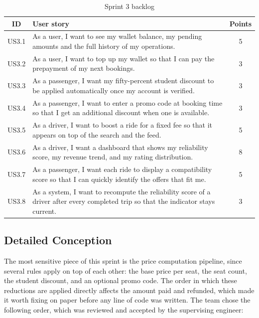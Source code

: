 \begin{table}[H]
\centering
\caption{Sprint 3 backlog}
\label{tab:sprint3_backlog}
\begin{tabular}{|c|p{8.5cm}|c|}
\hline
\textbf{ID} & \textbf{User story} & \textbf{Points} \\
\hline
US3.1 & As a user, I want to see my wallet balance, my pending amounts and the full history of my operations. & 5 \\
\hline
US3.2 & As a user, I want to top up my wallet so that I can pay the prepayment of my next bookings. & 3 \\
\hline
US3.3 & As a passenger, I want my fifty-percent student discount to be applied automatically once my account is verified. & 3 \\
\hline
US3.4 & As a passenger, I want to enter a promo code at booking time so that I get an additional discount when one is available. & 3 \\
\hline
US3.5 & As a driver, I want to boost a ride for a fixed fee so that it appears on top of the search and the feed. & 5 \\
\hline
US3.6 & As a driver, I want a dashboard that shows my reliability score, my revenue trend, and my rating distribution. & 8 \\
\hline
US3.7 & As a passenger, I want each ride to display a compatibility score so that I can quickly identify the offers that fit me. & 5 \\
\hline
US3.8 & As a system, I want to recompute the reliability score of a driver after every completed trip so that the indicator stays current. & 3 \\
\hline
\end{tabular}
\end{table}

\subsection{Detailed Conception}

The most sensitive piece of this sprint is the price computation pipeline, since several rules apply on top of each other: the base price per seat, the seat count, the student discount, and an optional promo code. The order in which these reductions are applied directly affects the amount paid and refunded, which made it worth fixing on paper before any line of code was written. The team chose the following order, which was reviewed and accepted by the supervising engineer:

